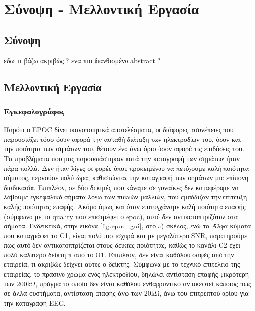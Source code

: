 \documentclass[11pt,a4paper,english,greek,twoside]{../Thesis}
\begin{document}
\chapter{Σύνοψη - Μελλοντική Εργασία} \label{chap:last}

\section{Σύνοψη}
εδω τι βάζω ακριβώς ? ενα πιο διανθισμένο abstract ? 

\section{Μελλοντική Εργασία}

\subsection{Εγκεφαλογράφος}
Παρότι ο EPOC δίνει ικανοποιητικά αποτελέσματα, οι διάφορες ασυνέπειες που παρουσιάζει τόσο όσον αφορά την ασταθή διάταξη των ηλεκτροδίων του, όσον και την ποιότητα των σημάτων του, θέτουν ένα άνω όριο όσον αφορά τις επιδόσεις του. Τα προβλήματα που μας παρουσιάστηκαν κατά την καταγραφή των σημάτων ήταν πάρα πολλά. Δεν ήταν λίγες οι φορές όπου προκειμένου να πετύχουμε καλή ποιότητα σήματος, περνούσε πολύ ώρα, καθιστώντας την καταγραφή των σημάτων μια επίπονη διαδικασία. Επιπλέον, σε δύο δοκιμές που κάναμε σε γυναίκες δεν καταφέραμε να λάβουμε εγκεφαλικά σήματα λόγω των πυκνών μαλλιών, που εμπόδιζαν την επίτευξη καλής ποιότητας επαφής. Ακόμα όμως και όταν επιτυγχάναμε καλή ποιότητα επαφής (σύμφωνα με το quality που επιστρέφει ο epoc), αυτό δεν αντικατοπτριζόταν στα σήματα. Ενδεικτικά, στην εικόνα \ref{fig:epoc_gui}, στο a) σκέλος, ενώ τα Άλφα κύματα που καταγράφει το O1, είναι πολύ πιο ισχυρά και με μεγαλύτερο SNR, παρατηρούμε πως αυτό δεν αντικατοπτρίζεται στους δείκτες ποιότητας, καθώς το κανάλι O2 έχει πολύ καλύτερο δείκτη π από το O1. Επιπλέον, δεν είναι καθόλου σαφές από την εταιρεία, τι ακριβώς δείχνει αυτός ο δείκτης. Σύμφωνα με το τεχνικό επιτελείο της εταιρείας, το πράσινο χρώμα ενός ηλεκτροδίου, δηλώνει αντίσταση επαφής μικρότερη των 200kΩ, πράγμα το οποίο δεν είναι καθόλου ενθαρρυντικό αν σκεφτεί κάποιος πως σε άλλα συστήματα, αντίσταση επαφής άνω των 20kΩ, άνω του επιτρεπτού ορίου για την καταγραφή EEG.
\end{document}
